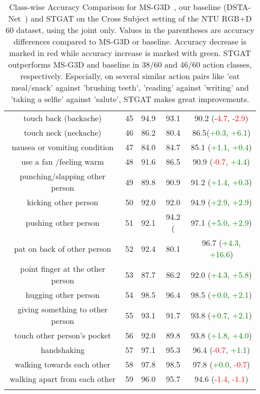\documentclass[runningheads]{llncs}
\begin{document}
\begin{centering}
\begin{longtable}{c|c|ccc}
        touch back (backache)             & 45   & 94.9  & 93.1   & 90.2 (\textcolor{red}{-4.7}, \textcolor{red}{-2.9})     \\
        touch neck (neckache)             & 46   & 86.2  & 80.4   & 86.5(\textcolor{green}{+0.3}, \textcolor{green}{+6.1})     \\
        nausea or vomiting condition      & 47   & 84.0  & 84.7   & 85.1 (\textcolor{green}{+1.1}, \textcolor{green}{+0.4})  \\
        use a fan /feeling warm           & 48   & 91.6  & 86.5   & 90.9 (\textcolor{red}{-0.7}, \textcolor{green}{+4.4})   \\
        punching/slapping other person    & 49   & 89.8  & 90.9  & 91.2 (\textcolor{green}{+1.4}, \textcolor{green}{+0.3})  \\
        kicking other person              & 50   & 92.0  & 92.0  & 94.9 (\textcolor{green}{+2.9}, \textcolor{green}{+2.9})  \\
        pushing other person              & 51   & 92.1  & 94.2 ( & 97.1 (\textcolor{green}{+5.0}, \textcolor{green}{+2.9})  \\
        pat on back of other person       & 52   & 92.4  & 80.1   & 96.7 (\textcolor{green}{+4.3}, \textcolor{green}{+16.6}) \\
        point finger at the other person  & 53   & 87.7  & 86.2   & 92.0 (\textcolor{green}{+4.3}, \textcolor{green}{+5.8})   \\
        hugging other person              & 54   & 98.5  & 96.4     & 98.5 (\textcolor{green}{+0.0}, \textcolor{green}{+2.1})   \\
        giving something to other person  & 55   & 93.1  & 91.7   & 93.8 (\textcolor{green}{+0.7}, \textcolor{green}{+2.1})  \\
        touch other person's pocket       & 56   & 92.0  & 89.8   & 93.8 (\textcolor{green}{+1.8}, \textcolor{green}{+4.0})   \\
        handshaking                       & 57   & 97.1  & 95.3     & 96.4 (\textcolor{red}{-0.7}, \textcolor{green}{+1.1})   \\
        walking towards each other        & 58   & 97.8  & 98.5   & 97.8 (\textcolor{green}{+0.0}, \textcolor{red}{-0.7})     \\
        walking apart from each other     & 59   & 96.0  & 95.7   & 94.6 (\textcolor{red}{-1.4}, \textcolor{red}{-1.1})     \\
        \hline
\caption{Class-wise Accuracy Comparison for MS-G3D~\cite{liu2020disentangling}, our baseline (DSTA-Net~\cite{shi2020decoupled}) and STGAT on the Cross Subject setting of the NTU RGB+D 60 dataset, using the joint only. Values in the parentheses are accuracy differences compared to MS-G3D or baseline. Accuracy decrease is marked in red while accuracy increase is marked with green. STGAT outperforms MS-G3D and baseline in 38/60 and 46/60 action classes, respectively. Especially, on several similar action pairs like 'eat meal/snack' against 'brushing teeth', 'reading' against 'writing' and 'taking a selfie' against 'salute', STGAT makes great improvements.}
        \label{table2}\end{longtable}\end{centering}
\end{document}
